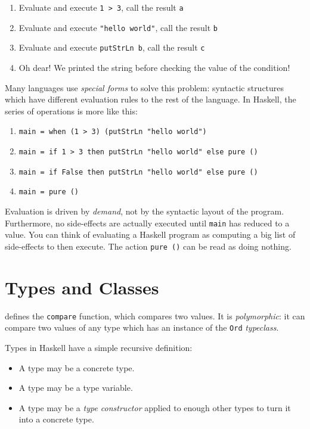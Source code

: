 \begin{enumerate}
\item Evaluate and execute \verb|1 > 3|, call the result \verb|a|
\item Evaluate and execute \verb|"hello world"|, call the result \verb|b|
\item Evaluate and execute \verb|putStrLn b|, call the result \verb|c|
\item Oh dear!  We printed the string before checking the value of the
  condition!
\end{enumerate}

Many languages use \emph{special forms} to solve this problem: syntactic
structures which have different evaluation rules to the rest of the language.
In Haskell, the series of operations is more like this:

\begin{enumerate}
\item \verb|main = when (1 > 3) (putStrLn "hello world")|
\item \verb|main = if 1 > 3 then putStrLn "hello world" else pure ()|
\item \verb|main = if False then putStrLn "hello world" else pure ()|
\item \verb|main = pure ()|
\end{enumerate}

Evaluation is driven by \emph{demand}, not by the syntactic layout of the
program.  Furthermore, no side-effects are actually executed until \verb|main|
has reduced to a value.  You can think of evaluating a Haskell program as
computing a big list of side-effects to then execute.  The action \verb|pure ()|
can be read as doing nothing.

\begin{figure}[b]
  \hrulefill
  \centering
  
  \label{fig:compare}
\end{figure}

\section*{Types and Classes}

 defines the \verb|compare| function, which compares two values.
It is \emph{polymorphic}: it can compare two values of any type which has an
instance of the \verb|Ord| \emph{typeclass}.

Types in Haskell have a simple recursive definition:

\begin{itemize}
\item A type may be a concrete type.
\item A type may be a type variable.
\item A type may be a \emph{type constructor} applied to enough other types to
  turn it into a concrete type.
\end{itemize}

